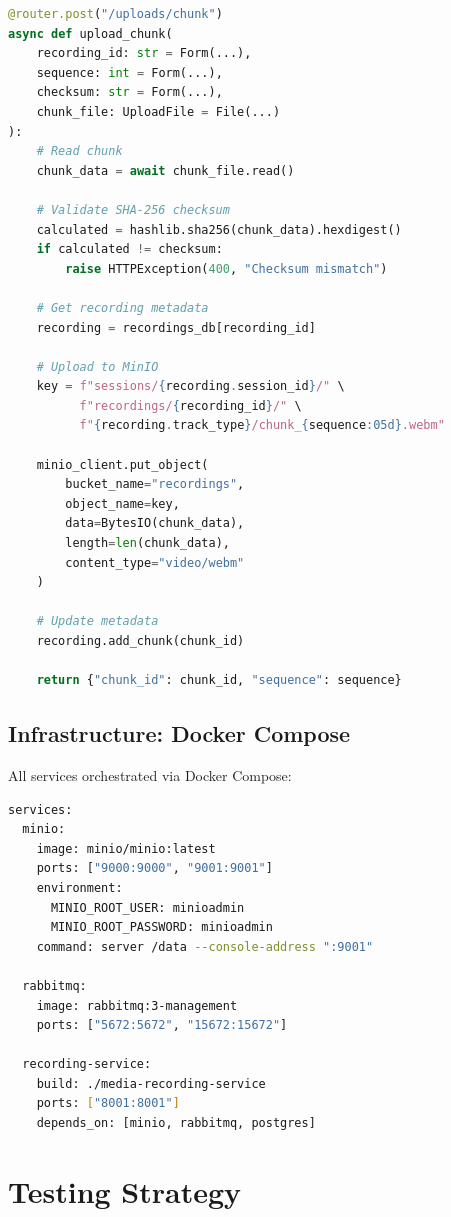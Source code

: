 \documentclass[12pt,a4paper]{article}
\begin{document}
\begin{lstlisting}[language=Python, caption=Upload Route (Condensed), basicstyle=\ttfamily\scriptsize]
@router.post("/uploads/chunk")
async def upload_chunk(
    recording_id: str = Form(...),
    sequence: int = Form(...),
    checksum: str = Form(...),
    chunk_file: UploadFile = File(...)
):
    # Read chunk
    chunk_data = await chunk_file.read()

    # Validate SHA-256 checksum
    calculated = hashlib.sha256(chunk_data).hexdigest()
    if calculated != checksum:
        raise HTTPException(400, "Checksum mismatch")

    # Get recording metadata
    recording = recordings_db[recording_id]

    # Upload to MinIO
    key = f"sessions/{recording.session_id}/" \
          f"recordings/{recording_id}/" \
          f"{recording.track_type}/chunk_{sequence:05d}.webm"

    minio_client.put_object(
        bucket_name="recordings",
        object_name=key,
        data=BytesIO(chunk_data),
        length=len(chunk_data),
        content_type="video/webm"
    )

    # Update metadata
    recording.add_chunk(chunk_id)

    return {"chunk_id": chunk_id, "sequence": sequence}
\end{lstlisting}

\subsection{Infrastructure: Docker Compose}

All services orchestrated via Docker Compose:

\begin{lstlisting}[language=bash, caption=Key Services, basicstyle=\ttfamily\scriptsize]
services:
  minio:
    image: minio/minio:latest
    ports: ["9000:9000", "9001:9001"]
    environment:
      MINIO_ROOT_USER: minioadmin
      MINIO_ROOT_PASSWORD: minioadmin
    command: server /data --console-address ":9001"

  rabbitmq:
    image: rabbitmq:3-management
    ports: ["5672:5672", "15672:15672"]

  recording-service:
    build: ./media-recording-service
    ports: ["8001:8001"]
    depends_on: [minio, rabbitmq, postgres]
\end{lstlisting}

\section{Testing Strategy}
\end{document}
